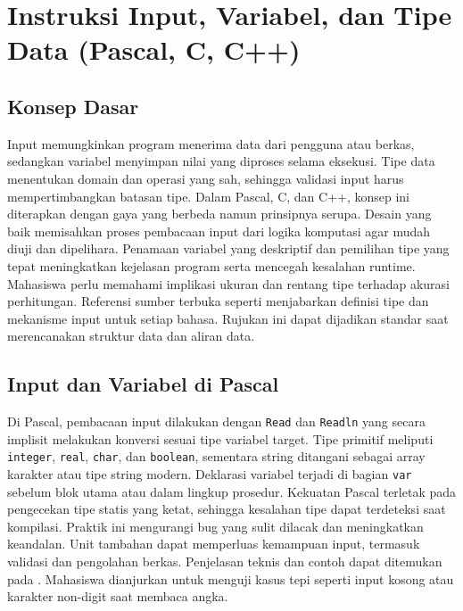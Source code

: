 \documentclass[../main.tex]{subfiles}
\begin{document}
\chapter{Instruksi Input, Variabel, dan Tipe Data (Pascal, C, C++)}
\section{Konsep Dasar}
Input memungkinkan program menerima data dari pengguna atau berkas, sedangkan variabel menyimpan nilai yang diproses selama eksekusi. Tipe data menentukan domain dan operasi yang sah, sehingga validasi input harus mempertimbangkan batasan tipe. Dalam Pascal, C, dan C++, konsep ini diterapkan dengan gaya yang berbeda namun prinsipnya serupa.
Desain yang baik memisahkan proses pembacaan input dari logika komputasi agar mudah diuji dan dipelihara. Penamaan variabel yang deskriptif dan pemilihan tipe yang tepat meningkatkan kejelasan program serta mencegah kesalahan runtime. Mahasiswa perlu memahami implikasi ukuran dan rentang tipe terhadap akurasi perhitungan.
Referensi sumber terbuka seperti \textcite{pascal-tutorial-wikibooks,gnu-c-manual,cpp-reference} menjabarkan definisi tipe dan mekanisme input untuk setiap bahasa. Rujukan ini dapat dijadikan standar saat merencanakan struktur data dan aliran data.

\section{Input dan Variabel di Pascal}
Di Pascal, pembacaan input dilakukan dengan \texttt{Read} dan \texttt{Readln} yang secara implisit melakukan konversi sesuai tipe variabel target. Tipe primitif meliputi \texttt{integer}, \texttt{real}, \texttt{char}, dan \texttt{boolean}, sementara string ditangani sebagai array karakter atau tipe string modern. Deklarasi variabel terjadi di bagian \texttt{var} sebelum blok utama atau dalam lingkup prosedur.
Kekuatan Pascal terletak pada pengecekan tipe statis yang ketat, sehingga kesalahan tipe dapat terdeteksi saat kompilasi. Praktik ini mengurangi bug yang sulit dilacak dan meningkatkan keandalan. Unit tambahan dapat memperluas kemampuan input, termasuk validasi dan pengolahan berkas.
Penjelasan teknis dan contoh dapat ditemukan pada \textcite{free-pascal-docs,pascal-tutorial-wikibooks}. Mahasiswa dianjurkan untuk menguji kasus tepi seperti input kosong atau karakter non-digit saat membaca angka.
\end{document}
